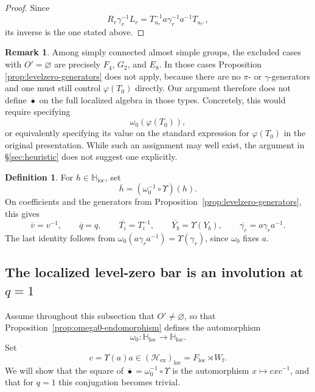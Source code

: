 \documentclass{amsart}
\theoremstyle{definition}
\newtheorem{defi}[Thm]{Definition}
\newtheorem{Rem}[Thm]{Remark}
\numberwithin{equation}{section}
\begin{document}
\begin{proof}
    Since
    \[
    R_r\gamma_r^{-1}L_r
    =
    T_{u_r}^{-1}a\gamma_r^{-1}a^{-1}T_{u_{r^*}},
    \]
    its inverse is the one stated above.
\end{proof}

\begin{Rem}\label{rem:not0}
    Among simply connected almost simple groups, the excluded cases with $O' = \varnothing$ are precisely $F_4$, $G_2$, and $E_8$. In those cases Proposition \ref{prop:levelzero-generators} does not apply, because there are no $\pi$- or $\gamma$-generators and one must still control \(\varphi(T_0)\) directly. Our argument therefore does not define $\overline{\bullet}$ on the full localized algebra in those types. Concretely, this would require specifying
    \[
    \omega_0(\varphi(T_0)),
    \]
    or equivalently specifying its value on the standard expression for \(\varphi(T_0)\) in
    the original presentation. While such an assignment may well exist, the
    argument in \S\ref{sec:heuristic} does not suggest one explicitly.
\end{Rem}

\begin{defi}\label{def:levelzero-bar}
    For $h \in \mathbb{H}_{\mathrm{loc}}$, set
    \[
    \overline{h} = (\omega_0^{-1} \circ \Upsilon)(h).
    \]
    On coefficients and the generators from
    Proposition~\ref{prop:levelzero-generators}, this gives
    \[
    \overline v=v^{-1},
    \qquad
    \overline q=q,
    \qquad
    \overline{T_i}=T_i^{-1},
    \qquad
    \overline{Y_b}=\Upsilon(Y_b),
    \qquad
    \overline{\gamma_r}=a\gamma_r a^{-1}.
    \]
    The last identity follows from
    \(\omega_0(a\gamma_r a^{-1})=\Upsilon(\gamma_r)\), since \(\omega_0\)
    fixes \(a\).
\end{defi}

\subsection{The localized level-zero bar is an involution at $q=1$}\label{sec:levelzero-involution}

Assume throughout this subsection that $O'\neq\varnothing$, so that
Proposition~\ref{prop:omega0-endomorphism} defines the automorphism
\[
\omega_0:\mathbb H_{\mathrm{loc}}\to \mathbb H_{\mathrm{loc}}.
\]
Set
\[
c=\Upsilon(a)a\in (\mathcal H_{\mathrm{ex}})_{\mathrm{loc}}=F_{\mathrm{loc}}\rtimes W_{\mathrm f}.
\]
We will show that the square of $\overline{\bullet}=\omega_0^{-1}\circ\Upsilon$ is the automorphism \(x\mapsto cxc^{-1}\), and that for $q=1$ this conjugation becomes trivial.
\end{document}
